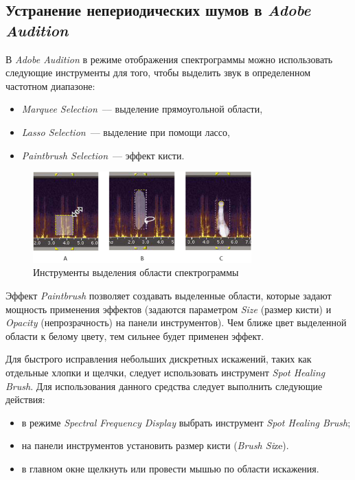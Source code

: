 \documentclass[oneside, final, 14pt]{extreport}
\begin{document}
\subsection{Устранение непериодических шумов в \emph{Adobe Audition}}
В \textit{Adobe Audition} в режиме отображения спектрограммы можно использовать следующие инструменты для того, чтобы выделить звук в определенном частотном диапазоне:
\begin{itemize}
\item \textit{Marquee Selection}~--– выделение прямоугольной области,
\item \textit{Lasso Selection}~--– выделение при помощи лассо,
\item \textit{Paintbrush Selection}~--– эффект кисти.
\end{itemize}

\begin{figure}[h]
\centering
\includegraphics[width=0.75\textwidth]{pic-spectroedit-01}
\caption{Инструменты выделения области спектрограммы}
\label{pic-spectroedit-01}
\end{figure}

Эффект \textit{Paintbrush} позволяет создавать выделенные области, которые задают мощность применения эффектов (задаются параметром \textit{Size} (размер кисти) и \textit{Opacity }(непрозрачность) на панели инструментов). Чем ближе цвет выделенной области к белому цвету, тем сильнее будет применен эффект.

Для быстрого исправления небольших дискретных искажений, таких как отдельные хлопки и щелчки, следует использовать инструмент \textit{Spot Healing Brush}.
Для использования данного средства следует выполнить следующие действия:
\begin{itemize}
\item в режиме \textit{Spectral Frequency Display} выбрать инструмент \textit{Spot Healing Brush};
\item на панели инструментов установить размер кисти (\textit{Brush Si}ze).
\item в главном окне щелкнуть или провести мышью по области искажения.
\end{itemize}
\end{document}
